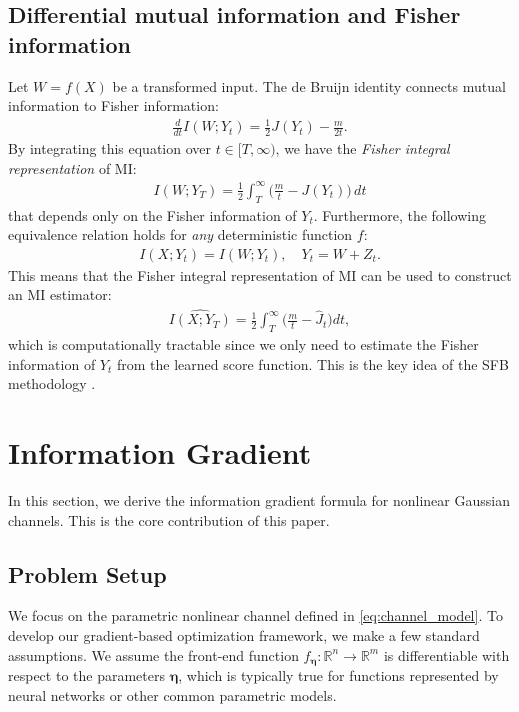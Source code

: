 \documentclass[conference]{IEEEtran}
\newcommand{\R}{\mathbb{R}}
\newcommand{\Yt}{Y_t}
\begin{document}
\subsection{Differential mutual information and Fisher information}

Let $W = f(X)$ be a transformed input.
The de Bruijn identity \cite{stam1959,barron1986entropy}
connects mutual information to Fisher information:
\begin{align}
\frac{d}{dt}I(W; \Yt) = \frac{1}{2}J(\Yt) - \frac{m}{2t}.
\end{align}
By integrating this equation over $t\in[T,\infty)$, 
we have the {\em Fisher integral representation} of MI:
\begin{align}
  I(W;Y_T)=\frac12\int_T^\infty\!\Big(\frac{m}{t}-J(Y_t)\Big)\,dt
\end{align}
that depends only on the Fisher information of $Y_t$.
Furthermore, the following equivalence relation
holds for \emph{any} deterministic function $f$:
\begin{align}
    I(X;Y_t)=I(W;Y_t), \quad Y_t = W + Z_t.
\end{align}
This means that the Fisher integral representation of MI 
can be used to construct an MI estimator:
\begin{align}
    \label{eq:mi-estimation}
     \widehat{I(X;Y_T)} = \frac{1}{2}\int_T^{\infty}\Big(\frac{m}{t}-\widehat J_t\Big) dt,
\end{align}
which is computationally tractable since we only need to estimate 
the Fisher information of $Y_t$ from the learned score function.
This is the key idea of the SFB methodology \cite{wadayama2025}.

\section{Information Gradient}
\label{sec:general}

In this section, we derive the information gradient formula for nonlinear Gaussian channels.
This is the core contribution of this paper.

\subsection{Problem Setup}
\label{subsec:setup}

We focus on the parametric nonlinear channel defined in \eqref{eq:channel_model}. 
To develop our gradient-based optimization framework, we make a few standard assumptions. 
We assume the front-end function $f_{\bm \eta}: \R^n \to \R^m$ is differentiable 
with respect to the parameters $\bm \eta$, which is typically true for functions 
represented by neural networks or other common parametric models. 
\end{document}
